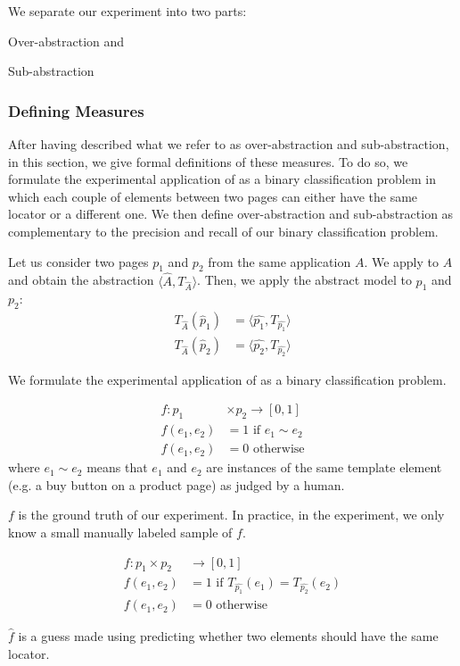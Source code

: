 We separate our experiment into two parts:
\begin{inparaenum}
    \item Over-abstraction and
    \item Sub-abstraction
\end{inparaenum}

\subsubsection{Defining Measures}\label{sec_definition_measures}
After having described what we refer to as over-abstraction and sub-abstraction, in this section, we give formal definitions of these measures.
To do so, we formulate the experimental application of \appstract{} as a binary classification problem in which each couple of elements between two pages can either have the same locator or a different one.
We then define over-abstraction and sub-abstraction as complementary to the precision and recall of our binary classification problem.

Let us consider two pages $p_1$ and $p_2$ from the same application $A$.
We apply \appstract{} to $A$ and obtain the abstraction $\langle \hat{A}, T_{\hat{A}} \rangle$.
Then, we apply the abstract model to $p_1$ and $p_2$: 
\begin{align}
T_{\hat{A}}(\hat{p}_1) &= \langle \hat{p_1}, T_{\hat{p_1}} \rangle \\
T_{\hat{A}}(\hat{p}_2) &= \langle \hat{p_2}, T_{\hat{p_2}} \rangle
\end{align}

We formulate the experimental application of \appstract{} as a binary classification problem.
\begin{defn}
\begin{align}
f:  p_1 & \times p_2 \to [0, 1] \\
f(e_1, e_2) &= 1 \text{ if $e_1 \sim e_2$} \\
f(e_1, e_2) &= 0 \text{ otherwise}
\end{align}
where $e_1 \sim e_2$ means that $e_1$ and $e_2$ are instances of the same template element (e.g. a buy button on a product page) as judged by a human.
\end{defn}
$f$ is the ground truth of our experiment. In practice, in the experiment, we only know a small manually labeled sample of $f$.

\begin{defn}
\begin{align}
f:  p_1 \times p_2 & \to [0, 1] \\
f(e_1, e_2) &= 1  \text{ if $T_{\hat{p_1}}(e_1) =  T_{\hat{p_2}}(e_2)$}\\
f(e_1, e_2) &= 0 \text{ otherwise}
\end{align}
\end{defn}
$\hat{f}$ is a guess made using \appstract{} predicting whether two elements should have the same locator.


